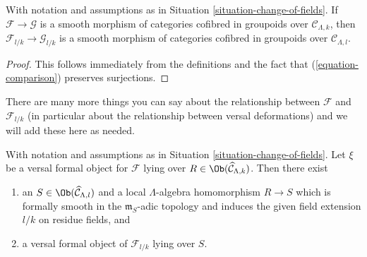 \begin{lemma}
\label{lemma-change-of-fields-smooth}
With notation and assumptions as in Situation \ref{situation-change-of-fields}.
If $\mathcal{F} \to \mathcal{G}$ is a smooth morphism of categories cofibred
in groupoids over $\mathcal{C}_{\Lambda, k}$, then
$\mathcal{F}_{l/k} \to \mathcal{G}_{l/k}$ is a smooth morphism of categories
cofibred in groupoids over $\mathcal{C}_{\Lambda, l}$.
\end{lemma}

\begin{proof}
This follows immediately from the definitions and the fact that
(\ref{equation-comparison}) preserves surjections.
\end{proof}

\noindent
There are many more things you can say about the relationship between
$\mathcal{F}$ and $\mathcal{F}_{l/k}$ (in particular about the relationship
between versal deformations) and we will add these here as needed.

\begin{lemma}
\label{lemma-change-of-field-versal-ring}
With notation and assumptions as in Situation \ref{situation-change-of-fields}.
Let $\xi$ be a versal formal object for $\mathcal{F}$ lying over
$R \in \Ob(\widehat{\mathcal{C}}_{\Lambda, k})$. Then there exist
\begin{enumerate}
\item an $S \in \Ob(\widehat{\mathcal{C}}_{\Lambda, l})$
and a local $\Lambda$-algebra homomorphism $R \to S$ which is
formally smooth in the $\mathfrak m_S$-adic topology and induces
the given field extension $l/k$ on residue fields, and
\item a versal formal object of $\mathcal{F}_{l/k}$ lying over $S$.
\end{enumerate}
\end{lemma}

